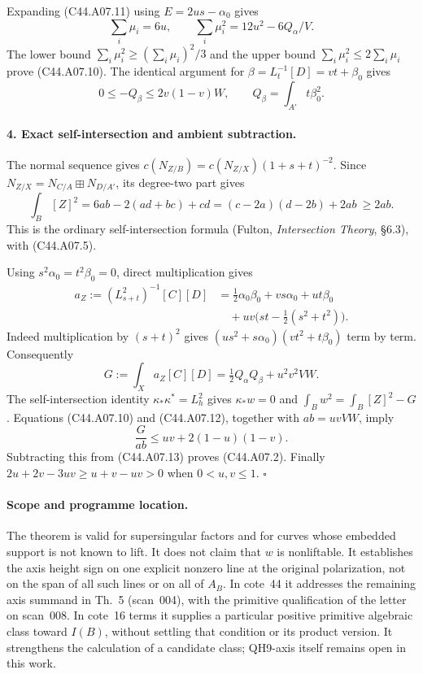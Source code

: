 \documentclass[11pt]{article}
\theoremstyle{remark}\newtheorem{remark}[theorem]{Remark}
\begin{document}
Expanding (C44.A07.11) using $E=2us-\alpha_0$ gives
\[
 \sum_i\mu_i=6u,\qquad
 \sum_i\mu_i^2=12u^2-6Q_\alpha/V.
\]
The lower bound $\sum_i\mu_i^2\ge(\sum_i\mu_i)^2/3$ and the
upper bound $\sum_i\mu_i^2\le2\sum_i\mu_i$ prove
(C44.A07.10). The identical argument for
$\beta=L_t^{-1}[D]=vt+\beta_0$ gives
\[
 0\le -Q_\beta\le2v(1-v)W,
 \qquad Q_\beta=\int_{A'}t\beta_0^2.
 \tag{C44.A07.12}
\]

\paragraph{4. Exact self-intersection and ambient subtraction.}
The normal sequence gives
$c(N_{Z/B})=c(N_{Z/X})(1+s+t)^{-2}$. Since
$N_{Z/X}=N_{C/A}\boxplus N_{D/A'}$, its degree-two part gives
\[
 \int_B[Z]^2=6ab-2(ad+bc)+cd
              =(c-2a)(d-2b)+2ab\ \ge2ab.
 \tag{C44.A07.13}
\]
This is the ordinary self-intersection formula (Fulton,
\emph{Intersection Theory}, \S6.3), with (C44.A07.5).

Using $s^2\alpha_0=t^2\beta_0=0$, direct multiplication gives
\[
 \begin{split}
 a_Z:=(L_{s+t}^2)^{-1}[C][D]
 &=\tfrac12\alpha_0\beta_0+v s\alpha_0+u t\beta_0\\
 &\quad+uv\bigl(st-\tfrac12(s^2+t^2)\bigr).
 \end{split}
 \tag{C44.A07.14}
\]
Indeed multiplication by $(s+t)^2$ gives
$(us^2+s\alpha_0)(vt^2+t\beta_0)$ term by term.
Consequently
\[
 G:=\int_Xa_Z[C][D]
       =\tfrac12Q_\alpha Q_\beta+u^2v^2VW.
 \tag{C44.A07.15}
\]
The self-intersection identity $\kappa_*\kappa^*=L_h^2$ gives
$\kappa_*w=0$ and
$\int_Bw^2=\int_B[Z]^2-G$. Equations (C44.A07.10) and
(C44.A07.12), together with $ab=uvVW$, imply
\[
 \frac{G}{ab}\le uv+2(1-u)(1-v).
\]
Subtracting this from (C44.A07.13) proves (C44.A07.2).
Finally $2u+2v-3uv\ge u+v-uv>0$ when $0<u,v\le1$.
\hfill$\square$

\paragraph{Scope and programme location.}
The theorem is valid for supersingular factors and for curves
whose embedded support is not known to lift. It does not claim
that $w$ is nonliftable. It establishes the axis height sign on
one explicit nonzero line at the original polarization, not on
the span of all such lines or on all of $A_B$. In cote~44 it
addresses the remaining axis summand in Th.~5 (scan~004), with
the primitive qualification of the letter on scan~008. In
cote~16 terms it supplies a particular positive primitive
algebraic class toward $I(B)$, without settling that condition
or its product version. It strengthens the calculation of a
candidate class; QH9-axis itself remains open in this work.
\end{document}
